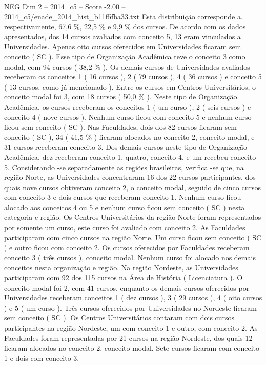 \begin{textsample}{NEG Dim 2 – 2014\_c5 – Score -2.00 – 2014\_c5/enade\_2014\_hist\_b11f5fba33.txt}
Esta distribuição corresponde a, respectivamente, 67,6 \%, 22,5 \% e 9,9 \% dos cursos.
De acordo com os dados apresentados, dos 14 cursos avaliados com conceito 5, 13 eram vinculados a Universidades.
Apenas oito cursos oferecidos em Universidades ficaram sem conceito ( SC ).
Esse tipo de Organização Acadêmica teve o conceito 3 como modal, com 94 cursos ( 38,2 \% ).
Os demais cursos de Universidades avaliados receberam os conceitos 1 ( 16 cursos ), 2 ( 79 cursos ), 4 ( 36 cursos ) e conceito 5 ( 13 cursos, como já mencionado ).
Entre os cursos em Centros Universitários, o conceito modal foi 3, com 18 cursos ( 50,0 \% ).
Neste tipo de Organização Acadêmica, os cursos receberam os conceitos 1 ( um curso ), 2 ( seis cursos ) e conceito 4 ( nove cursos ).
Nenhum curso ficou com conceito 5 e nenhum curso ficou sem conceito ( SC ).
Nas Faculdades, dois dos 82 cursos ficaram sem conceito ( SC ), 34 ( 41,5 \% ) ficaram alocados no conceito 2, conceito modal, e 31 cursos receberam conceito 3.
Dos demais cursos neste tipo de Organização Acadêmica, dez receberam conceito 1, quatro, conceito 4, e um recebeu conceito 5.
Considerando -se separadamente as regiões brasileiras, verifica -se que, na região Norte, as Universidades concentraram 16 dos 22 cursos participantes, dos quais nove cursos obtiveram conceito 2, o conceito modal, seguido de cinco cursos com conceito 3 e dois cursos que receberam conceito 1.
Nenhum curso ficou alocado aos conceitos 4 ou 5 e nenhum curso ficou sem conceito ( SC ) nesta categoria e região.
Os Centros Universitários da região Norte foram representados por somente um curso, este curso foi avaliado com conceito 2.
As Faculdades participaram com cinco cursos na região Norte.
Um curso ficou sem conceito ( SC ) e outro ficou com conceito 2.
Os cursos oferecidos por Faculdades receberam conceito 3 ( três cursos ), conceito modal.
Nenhum curso foi alocado nos demais conceitos nesta organização e região.
Na região Nordeste, as Universidades participaram com 92 dos 115 cursos na Área de História ( Licenciatura ).
O conceito modal foi 2, com 41 cursos, enquanto os demais cursos oferecidos por Universidades receberam conceitos 1 ( dez cursos ), 3 ( 29 cursos ), 4 ( oito cursos ) e 5 ( um curso ).
Três cursos oferecidos por Universidades no Nordeste ficaram sem conceito ( SC ).
Os Centros Universitários contaram com dois cursos participantes na região Nordeste, um com conceito 1 e outro, com conceito 2.
As Faculdades foram representadas por 21 cursos na região Nordeste, dos quais 12 ficaram alocados no conceito 2, conceito modal.
Sete cursos ficaram com conceito 1 e dois com conceito 3.

\end{textsample}
